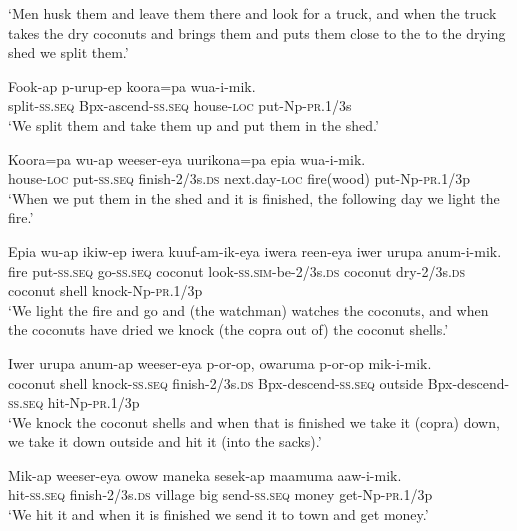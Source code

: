 \glt ‘Men husk them and leave them there and look for a truck, and when the truck takes the dry coconuts and brings them and puts them close to the to the drying shed we split them.’ \\
\z


\ea
\gll  Fook-ap  p-urup-ep  koora=pa  wua-i-mik. \\
split-\textsc{ss.seq}  Bpx-ascend-\textsc{ss.seq}  house-\textsc{loc}  put-Np-\textsc{pr}.1/3s \\
\glt ‘We split them and take them up and put them in the shed.’ \\
\z


\ea
\gll  Koora=pa  wu-ap  weeser-eya  uurikona=pa  epia  wua-i-mik. \\
house-\textsc{loc}  put-\textsc{ss.seq}  finish-2/3s.\textsc{ds}  next.day-\textsc{loc}  fire(wood)  put-Np-\textsc{pr}.1/3p \\
\glt ‘When we put them in the shed and it is finished, the following day we light the fire.’ \\
\z


\ea
\gll  Epia  wu-ap  ikiw-ep  iwera  kuuf-am-ik-eya  iwera  reen-eya                  iwer  urupa  anum-i-mik. \\
fire  put-\textsc{ss.seq}  go-\textsc{ss.seq}  coconut  look-\textsc{ss}.\textsc{sim}-be-2/3s.\textsc{ds}  coconut  dry-2/3s.\textsc{ds}  coconut  shell  knock-Np-\textsc{pr}.1/3p \\


\glt ‘We light the fire and go and (the watchman) watches the coconuts, and when the coconuts have dried we knock (the copra out of) the coconut shells.’ \\
\z


\ea
\gll  Iwer  urupa  anum-ap  weeser-eya  p-or-op,                  owaruma  p-or-op  mik-i-mik. \\
coconut  shell  knock-\textsc{ss.seq}  finish-2/3s.\textsc{ds}  Bpx-descend-\textsc{ss.seq}  outside  Bpx-descend-\textsc{ss.seq}  hit-Np-\textsc{pr}.1/3p \\


\glt ‘We knock the coconut shells and when that is finished we take it (copra) down, we take it down outside and hit it (into the sacks).’ \\
\z


\ea
\gll  Mik-ap  weeser-eya  owow  maneka  sesek-ap  maamuma  aaw-i-mik. \\
hit-\textsc{ss.seq}  finish-2/3s.\textsc{ds}  village  big  send-\textsc{ss.seq}  money  get-Np-\textsc{pr}.1/3p \\
\glt ‘We hit it and when it is finished we send it to town and get money.’ \\
\z


